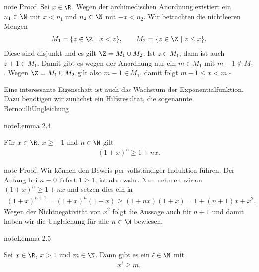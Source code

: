\documentclass[letterpaper,10pt,english]{jupyterBook}
\begin{document}
\begin{sphinxadmonition}{note}
Proof. Sei \(x \in \R\). Wegen der archimedischen Anordnung existiert ein \(n_1 \in \N\) mit \(x < n_1\) und \(n_2 \in \N\) mit \(-x < n_2\). Wir betrachten die nichtleeren Mengen
\begin{equation*}
\begin{split}M_1 = \{ z \in \Z~|~ x < z\}, \qquad M_2 = \{ z \in \Z~|~ z \leq x\}.\end{split}
\end{equation*}
Diese sind disjunkt und es gilt \(\Z = M_1 \cup M_2\). Ist \(z \in M_1\), dann ist auch \(z+1 \in M_1\). Damit gibt es wegen der Anordnung nur ein \(m \in M_1\) mit \(m-1 \notin M_1\). Wegen \(\Z = M_1 \cup M_2\) gilt also \(m-1 \in M_1\), damit folgt \(  m-1 \leq x < m . \square\)
\end{sphinxadmonition}

Eine interessante Eigenschaft ist auch das Wachstum der Exponentialfunktion. Dazu benötigen wir zunächst ein Hilfsresultat, die sogenannte Bernoulli\sphinxhyphen{}Ungleichung
\label{grundlagen/zahlensysteme:lemma-20}
\begin{sphinxadmonition}{note}{Lemma 2.4}



Für \(x \in \R\), \(x \geq -1\) und \(n\in \N\) gilt
\begin{equation*}
\begin{split} (1+x)^n \geq 1 + n x.\end{split}
\end{equation*}\end{sphinxadmonition}

\begin{sphinxadmonition}{note}
Proof. Wir können den Beweis per vollständiger Induktion führen. Der Anfang bei \(n=0\) liefert \(1 \geq 1\), ist also wahr. Nun nehmen wir an \((1+x)^n \geq 1 + n x\) und setzen dies ein in
\begin{equation*}
\begin{split} (1+x)^{n+1} = (1+x)^n (1+x) \geq (1+nx)(1+x) = 1+ (n+1)x +x^2.
 \end{split}
\end{equation*}
Wegen der Nichtnegativität von \(x^2\) folgt die Aussage auch für \(n+1\) und damit haben wir die Ungleichung für alle \(n\in \N\) bewiesen.
\end{sphinxadmonition}
\label{grundlagen/zahlensysteme:lemma-21}
\begin{sphinxadmonition}{note}{Lemma 2.5}



Sei \(x \in \R\), \(x  > 1\) und \(m\in \N\). Dann gibt es ein \(\ell \in \N\) mit
\begin{equation*}
\begin{split}x^\ell \geq m.\end{split}
\end{equation*}\end{sphinxadmonition}
\end{document}
